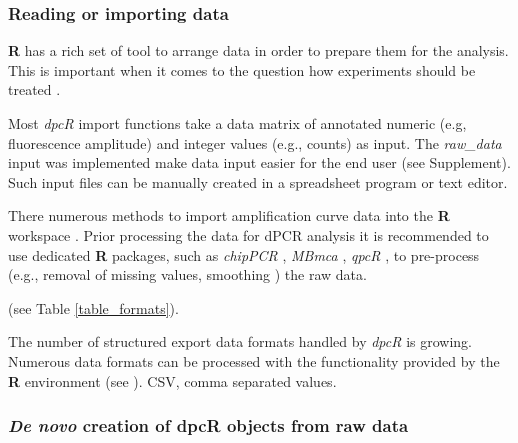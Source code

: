 \documentclass[a4,center,fleqn]{NAR}
\begin{document}
\subsubsection{Reading or importing data}

\textbf{R} has a rich set of tool to arrange data in order to prepare them for 
the analysis. This is important when it comes to the question how experiments 
should be treated \citep{rodiger_r_2015}.

Most \textit{dpcR} import functions take a data matrix of annotated numeric 
(e.g, fluorescence amplitude) and integer values (e.g., counts) as input. The 
\textit{raw\_data} input was implemented  make data input easier for the end 
user (see Supplement). Such input files can be manually created in a 
spreadsheet 
program or text editor.

There numerous methods to import amplification curve data into the \textbf{R} 
workspace \cite{perkins_readqpcr_2012, pabinger_survey_2014, rodiger_r_2015}. 
Prior processing the data for dPCR analysis it is recommended to use dedicated 
\textbf{R} packages, such as \textit{chipPCR} \cite{roediger2015chippcr}, 
\textit{MBmca} \cite{rodiger_surface_2013}, \textit{qpcR} 
\cite{ritz_qpcr_2008}, 
to pre-process (e.g., removal of missing values, smoothing 
\cite{spiess_impact_2015}) the raw data.

(see Table \ref{table_formats}).

\begin{table}[b]
 {The number of structured export data formats handled by \textit{dpcR} is 
growing. Numerous data formats can be processed with the functionality provided 
by the \textbf{R} environment (see \cite{rodiger_r_2015}). CSV, comma separated 
values.}
\end{table}

\subsubsection{\textit{De novo} creation of dpcR objects from raw data}
\end{document}
